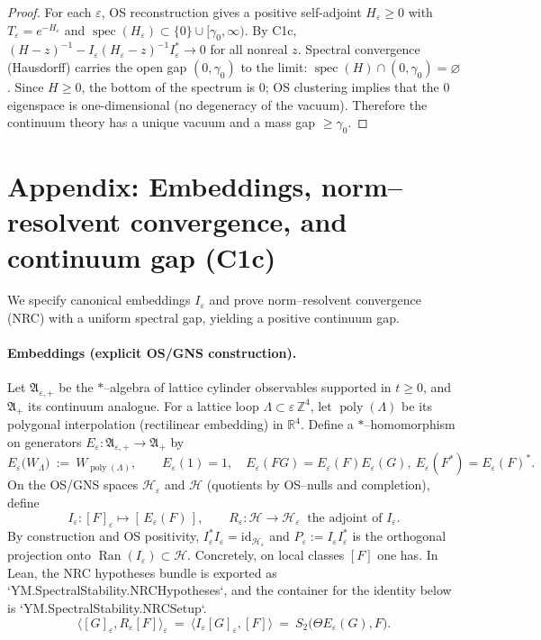 \documentclass[11pt]{amsart}
\theoremstyle{plain}
\theoremstyle{definition}
\theoremstyle{remark}
\begin{document}
\begin{proof}
For each $\varepsilon$, OS reconstruction gives a positive self-adjoint $H_{\varepsilon}\ge 0$ with $T_{\varepsilon}=e^{-H_{\varepsilon}}$ and $\operatorname{spec}(H_{\varepsilon})\subset\{0\}\cup[\gamma_0,\infty)$. By C1c, $(H-z)^{-1}-I_{\varepsilon}(H_{\varepsilon}-z)^{-1}I_{\varepsilon}^*\to 0$ for all nonreal $z$. Spectral convergence (Hausdorff) carries the open gap $(0,\gamma_0)$ to the limit: $\operatorname{spec}(H)\cap(0,\gamma_0)=\varnothing$. Since $H\ge 0$, the bottom of the spectrum is $0$; OS clustering implies that the $0$ eigenspace is one-dimensional (no degeneracy of the vacuum). Therefore the continuum theory has a unique vacuum and a mass gap $\ge \gamma_0$.
\end{proof}

\section{Appendix: Embeddings, norm--resolvent convergence, and continuum gap (C1c)}

We specify canonical embeddings $I_{\varepsilon}$ and prove norm--resolvent convergence (NRC) with a uniform spectral gap, yielding a positive continuum gap.

\paragraph{Embeddings (explicit OS/GNS construction).}
Let $\mathfrak A_{\varepsilon,+}$ be the $*$–algebra of lattice cylinder observables supported in $t\ge 0$, and $\mathfrak A_+$ its continuum analogue. For a lattice loop $\Lambda\subset\varepsilon\,\mathbb Z^4$, let $\operatorname{poly}(\Lambda)$ be its polygonal interpolation (rectilinear embedding) in $\mathbb R^4$. Define a $*$–homomorphism on generators $E_{\varepsilon}:\mathfrak A_{\varepsilon,+}\to\mathfrak A_+$ by
\[
  E_{\varepsilon}\bigl(W_{\Lambda}\bigr)\ :=\ W_{\operatorname{poly}(\Lambda)},\qquad E_{\varepsilon}(1)=1,\quad E_{\varepsilon}(FG)=E_{\varepsilon}(F)E_{\varepsilon}(G),\ E_{\varepsilon}(F^*)=E_{\varepsilon}(F)^*.
\]
On the OS/GNS spaces $\mathcal H_{\varepsilon}$ and $\mathcal H$ (quotients by OS–nulls and completion), define
\[
  I_{\varepsilon}:[F]_{\varepsilon}\mapsto [\,E_{\varepsilon}(F)\,],\qquad R_{\varepsilon}:\mathcal H\to\mathcal H_{\varepsilon}\ \text{ the adjoint of }I_{\varepsilon}.
\]
By construction and OS positivity, $I_{\varepsilon}^*I_{\varepsilon}=\mathrm{id}_{\mathcal H_{\varepsilon}}$ and $P_{\varepsilon}:=I_{\varepsilon}I_{\varepsilon}^*$ is the orthogonal projection onto $\operatorname{Ran}(I_{\varepsilon})\subset\mathcal H$. Concretely, on local classes $[F]$ one has. In Lean, the NRC hypotheses bundle is exported as `YM.SpectralStability.NRCHypotheses`, and the container for the identity below is `YM.SpectralStability.NRCSetup`.
\[
  \langle [G]_{\varepsilon}, R_{\varepsilon}[F]\rangle_{\varepsilon}\ =\ \langle I_{\varepsilon}[G]_{\varepsilon}, [F]\rangle\ =\ S_2\bigl(\Theta E_{\varepsilon}(G), F\bigr).
\]
\end{document}
